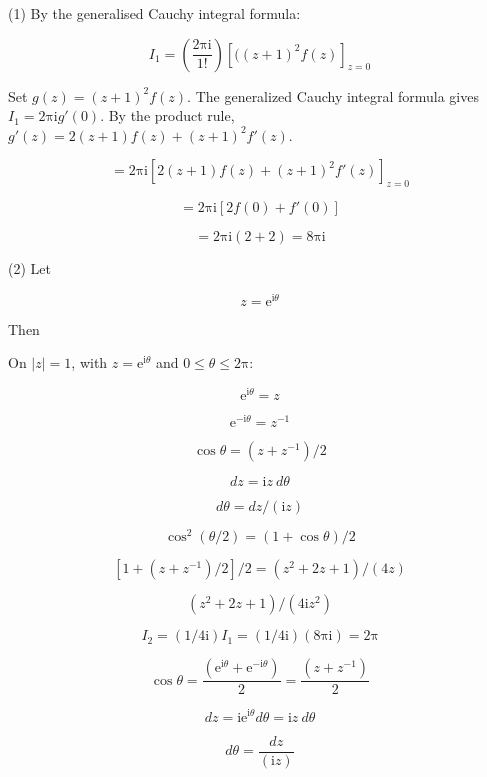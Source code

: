 \documentclass[11pt,a4paper]{article}
\theoremstyle{definition}
\theoremstyle{plain}
\begin{document}
(1) By the generalised Cauchy integral formula:

\begin{equation}
I_{1} = \left(\frac{2\mathrm{\pi}\mathrm{i}}{1!}\right){[((z + 1)^{2}f(z)]}_{z = 0}
\end{equation}

Set $g(z) = (z + 1)^{2}f(z)$. The generalized Cauchy integral formula gives $I_{1} = 2\mathrm{\pi}\mathrm{i}g'(0)$. By the product rule, $g'(z) = 2(z + 1)f(z) + (z + 1)^{2}f'(z)$.

\begin{equation}
= 2\mathrm{\pi}\mathrm{i}{[2(z + 1)f(z) + (z + 1)^{2}f'(z)]}_{z = 0}
\end{equation}

\[
= 2\mathrm{\pi}\mathrm{i}[2f(0) + f'(0)]
\]

\[
= 2\mathrm{\pi}\mathrm{i}(2 + 2) = 8\mathrm{\pi}\mathrm{i}
\]

(2) Let

\begin{equation}
z = \mathrm{e}^{\mathrm{i}\theta}
\end{equation}

Then

On $\vert{}z\vert{} = 1$, with $z = \mathrm{e}^{\mathrm{i}\theta}$ and $0 \le \theta \le 2\mathrm{\pi}$:

\begin{equation}
\mathrm{e}^{\mathrm{i}\theta} = z
\end{equation}

\[
\mathrm{e}^{-\mathrm{i}\theta} = z^{-1}
\]

\[
\cos \theta = (z + z^{-1})/2
\]

\[
dz = \mathrm{i}z\ d\theta
\]

\[
d\theta = dz/(\mathrm{i}z)
\]

\[
\cos^{2}(\theta /2) = (1 + \cos \theta)/2
\]

\[
[1 + (z + z^{-1})/2]/2 = (z^{2} + 2z + 1)/(4z)
\]

\[
(z^{2} + 2z + 1)/(4\mathrm{i}z^{2})
\]

\[
I_{2} = (1/4\mathrm{i})I_{1} = (1/4\mathrm{i})(8\mathrm{\pi}\mathrm{i}) = 2\mathrm{\pi}
\]

\[
\cos \theta = \frac{(\mathrm{e}^{\mathrm{i}\theta} + \mathrm{e}^{-\mathrm{i}\theta})}{2} = \frac{(z + z^{-1})}{2}
\]

\[
dz = {\mathrm{i}\mathrm{e}}^{\mathrm{i}\theta}d\theta = \mathrm{i}z\ d\theta
\]

\[
d\theta = \frac{dz}{(\mathrm{i}z)}
\]
\end{document}
